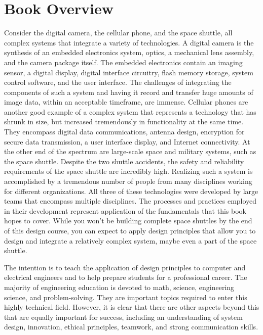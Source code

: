 \section{Book Overview}\label{book-overview}

Consider the digital camera, the cellular phone, and the space shuttle,
all complex systems that integrate a variety of technologies. A digital
camera is the synthesis of an embedded electronics system, optics, a
mechanical lens assembly, and the camera package itself. The embedded
electronics contain an imaging sensor, a digital display, digital
interface circuitry, flash memory storage, system control software, and
the user interface. The challenges of integrating the components of such
a system and having it record and transfer huge amounts of image data,
within an acceptable timeframe, are immense. Cellular phones are another
good example of a complex system that represents a technology that has
shrunk in size, but increased tremendously in functionality at the same
time. They encompass digital data communications, antenna design,
encryption for secure data transmission, a user interface display, and
Internet connectivity. At the other end of the spectrum are large-scale
space and military systems, such as the space shuttle. Despite the two
shuttle accidents, the safety and reliability requirements of the space
shuttle are incredibly high. Realizing such a system is accomplished by
a tremendous number of people from many disciplines working for
different organizations. All three of these technologies were developed
by large teams that encompass multiple disciplines. The processes and
practices employed in their development represent application of the
fundamentals that this book hopes to cover. While you won't be building
complete space shuttles by the end of this design course, you can expect
to apply design principles that allow you to design and integrate a
relatively complex system, maybe even a part of the space shuttle.


The intention is to teach the application of design principles to
computer and electrical engineers and to help prepare students for a
professional career. The majority of engineering education is devoted to
math, science, engineering science, and problem-solving. They are
important topics required to enter this highly technical field. However,
it is clear that there are other aspects beyond this that are equally
important for success, including an understanding of system design,
innovation, ethical principles, teamwork, and strong communication
skills.

